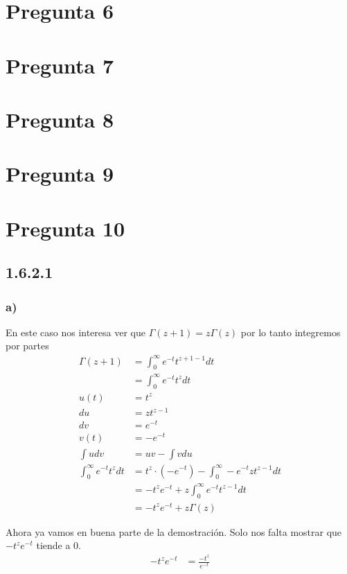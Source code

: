 \documentclass[12pt]{exam}
\begin{document}
\section*{Pregunta 6}

\section*{Pregunta 7}

\section*{Pregunta 8}

\section*{Pregunta 9}

\section*{Pregunta 10}
\subsection*{1.6.2.1}
\subsubsection*{a)}

En este caso nos interesa ver que $\Gamma(z + 1) = z\Gamma(z)$ por lo tanto integremos por partes
\begin{align*}
  \Gamma(z + 1) &= \int_{0}^{\infty} e^{-t} t^{z + 1 - 1} dt\\
  &= \int_0^\infty e^{-t} t^{z} dt\\
  u(t) &= t^{z}\\
  du &= zt^{z - 1}\\
  dv &= e^{-t}\\
  v(t) &= -e^{-t}\\
  \int udv &= uv - \int vdu\\
  \int_0^\infty e^{-t} t^{z} dt &= t^{z}\cdot(-e^{-t}) - \int_0^\infty -e^{-t}zt^{z - 1}dt\\
  &= -t^{z}e^{-t} + z\int_0^\infty e^{-t}t^{z-1}dt\\
  &= -t^{z}e^{-t} + z\Gamma(z)
\end{align*}

Ahora ya vamos en buena parte de la demostración. Solo nos falta mostrar que $-t^ze^{-t}$ tiende a 0.
\begin{align*}
  -t^{z}e^{-t} &= \frac{-t^z}{e^{-t}}\\
\end{align*}
\end{document}
